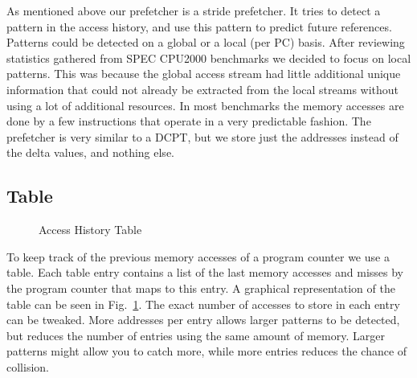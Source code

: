 As mentioned above our prefetcher is a stride prefetcher. It tries to detect a 
pattern in the access history, and use this pattern to predict future 
references. Patterns could be detected on a global or a local (per PC) basis.
After reviewing statistics gathered from SPEC CPU2000 benchmarks we decided to 
focus on local patterns. This was because the global access stream had little 
additional unique information that could not already be extracted from the 
local streams without using a lot of additional resources. In most benchmarks 
the memory accesses are done by a few instructions that operate in a very 
predictable fashion. The prefetcher is very similar to a DCPT, but we store just the 
addresses instead of the delta values, and nothing else.

\subsection{Table}

\begin{figure}
	\caption{Access History Table}
	\label{fig:table}
\end{figure}

To keep track of the previous memory accesses of a program counter we use a
table. Each table entry contains a list of the last memory accesses
and misses by the program counter that maps to this entry.
A graphical representation of the table can be seen in Fig.~\ref{fig:table}.
The exact number of accesses to store in each entry can be tweaked.
More addresses per entry allows larger patterns to be detected,
but reduces the number of entries using the same amount of memory.
Larger patterns might allow you to catch more, while more entries
reduces the chance of collision.

